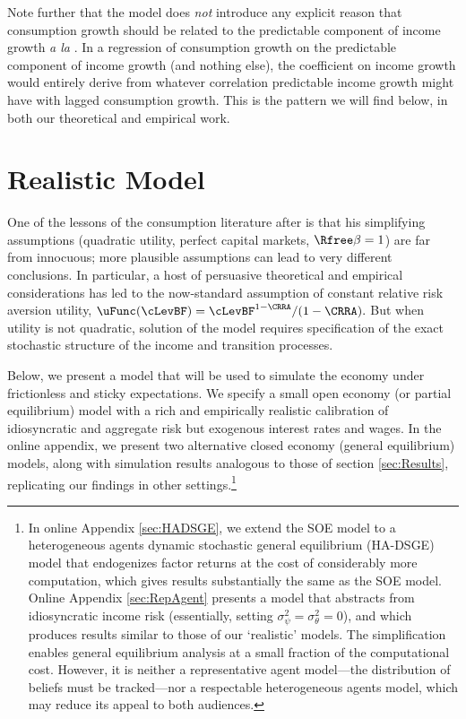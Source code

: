 Note further that the model does {\it not} introduce any explicit reason that consumption growth should be related to the predictable component of income growth {\it a la} \cite{cmModel}.  In a regression of consumption growth on the predictable component of income growth (and nothing else), the coefficient on income growth would entirely derive from whatever correlation predictable income growth might have with lagged consumption growth.  This is the pattern we will find below, in both our theoretical and empirical work.



\section{Realistic Model}
\label{sec:models}

One of the lessons of the consumption literature after \cite{hallRandomWalk} is that his simplifying assumptions (quadratic utility, perfect capital markets, $\Rfree\beta=1$) are far from innocuous; more plausible assumptions can lead to very different conclusions.  In particular, a host of persuasive theoretical and empirical considerations has led to the now-standard assumption of constant relative risk aversion utility, $\uFunc(\cLevBF)=\cLevBF^{1-\CRRA}/(1-\CRRA).$ But when utility is not quadratic, solution of the model requires specification of the exact stochastic structure of the income and transition processes.

Below, we present a model that will be used to simulate the economy under frictionless and sticky expectations.  We specify a small open economy (or partial equilibrium) model with a rich and empirically realistic calibration of idiosyncratic and aggregate risk but exogenous interest rates and wages. In the online appendix, we present two alternative closed economy (general equilibrium) models, along with simulation results analogous to those of section \ref{sec:Results}, replicating our findings in other settings.\footnote{In online Appendix \ref{sec:HADSGE}, we extend the SOE model to a heterogeneous agents dynamic stochastic general equilibrium (HA-DSGE) model that endogenizes factor returns at the cost of considerably more computation, which gives results substantially the same as the SOE model.  Online Appendix \ref{sec:RepAgent} presents a model that abstracts from idiosyncratic income risk (essentially, setting $\sigma^{2}_{\psi}=\sigma^{2}_{\theta}=0$), and which produces results similar to those of our `realistic' models.  The simplification enables general equilibrium analysis at a small fraction of the computational cost. However, it is neither a representative agent model---the distribution of beliefs must be tracked---nor a respectable heterogeneous agents model, which may reduce its appeal to both audiences.}

